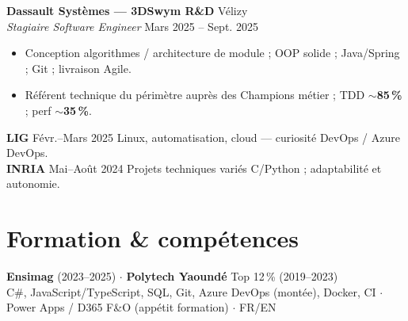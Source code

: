 \documentclass[10pt,a4paper]{article}
\begin{document}
\textbf{Dassault Syst\`emes --- 3DSwym R\&D} \hfill V\'elizy\\
\textit{Stagiaire Software Engineer} \hfill Mars 2025 -- Sept. 2025
\begin{itemize}
  \item Conception algorithmes / architecture de module ; OOP solide ; Java/Spring ; Git ; livraison Agile.
  \item R\'ef\'erent technique du p\'erim\`etre aupr\`es des Champions m\'etier ; TDD $\sim$\textbf{85\,\%} ; perf $\sim$\textbf{35\,\%}.
\end{itemize}

\textbf{LIG} \hfill F\'evr.--Mars 2025 \quad Linux, automatisation, cloud --- curiosit\'e DevOps / Azure DevOps.\\[1pt]
\textbf{INRIA} \hfill Mai--Ao\^ut 2024 \quad Projets techniques vari\'es C/Python ; adaptabilit\'e et autonomie.

\section{Formation \& comp\'etences}
\textbf{Ensimag} (2023--2025) $\cdot$ \textbf{Polytech Yaound\'e} Top 12\,\% (2019--2023)\\
C\#, JavaScript/TypeScript, SQL, Git, Azure DevOps (mont\'ee), Docker, CI $\cdot$ Power Apps / D365 F\&O (app\'etit formation) $\cdot$ FR/EN
\end{document}
